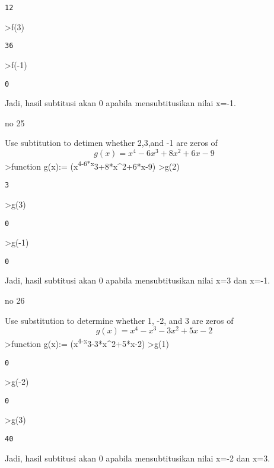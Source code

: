\documentclass[
]{book}
\begin{document}
\begin{verbatim}
12
\end{verbatim}

\textgreater f(3)

\begin{verbatim}
36
\end{verbatim}

\textgreater f(-1)

\begin{verbatim}
0
\end{verbatim}

Jadi, hasil subtitusi akan 0 apabila mensubtitusikan nilai x=-1.

no 25

Use subtitution to detimen whether 2,3,and -1 are zeros of\[g(x)=x^4-6x^3+8x^2+6x-9\]\textgreater function g(x):= (x\textsuperscript{4-6*x}3+8*x\^{}2+6*x-9) \textgreater g(2)

\begin{verbatim}
3
\end{verbatim}

\textgreater g(3)

\begin{verbatim}
0
\end{verbatim}

\textgreater g(-1)

\begin{verbatim}
0
\end{verbatim}

Jadi, hasil subtitusi akan 0 apabila mensubtitusikan nilai x=3 dan x=-1.

no 26

Use substitution to determine whether 1, -2, and 3 are zeros of\[g(x)= x^4-x^3-3x^2+5x-2\]\textgreater function g(x):= (x\textsuperscript{4-x}3-3*x\^{}2+5*x-2) \textgreater g(1)

\begin{verbatim}
0
\end{verbatim}

\textgreater g(-2)

\begin{verbatim}
0
\end{verbatim}

\textgreater g(3)

\begin{verbatim}
40
\end{verbatim}

Jadi, hasil subtitusi akan 0 apabila mensubtitusikan nilai x=-2 dan x=3.
\end{document}
